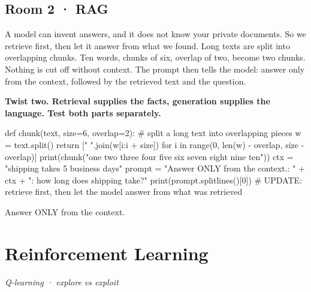 \documentclass[11pt,a4paper]{report}
\begin{document}
\section*{Room 2 · RAG}
A model can invent answers, and it does not know your private documents. So we retrieve first, then let it answer from what we found. Long texts are split into overlapping chunks. Ten words, chunks of six, overlap of two, become two chunks. Nothing is cut off without context. The prompt then tells the model: answer only from the context, followed by the retrieved text and the question.
\begin{tcolorbox}[colback=yellow!12,colframe=orange!70!black,boxrule=0.4pt,left=4pt,right=4pt,top=2pt,bottom=2pt]\textbf{Twist two. Retrieval supplies the facts, generation supplies the language. Test both parts separately.}\end{tcolorbox}
\begin{Code}
def chunk(text, size=6, overlap=2):         # split a long text into overlapping pieces
    w = text.split()
    return [" ".join(w[i:i + size]) for i in range(0, len(w) - overlap, size - overlap)]
print(chunk("one two three four five six seven eight nine ten"))
ctx = "shipping takes 5 business days"
prompt = "Answer ONLY from the context.\nContext: " + ctx + "\nQuestion: how long does shipping take?"
print(prompt.splitlines()[0])
# UPDATE: retrieve first, then let the model answer from what was retrieved
\end{Code}
\begin{Out}
Answer ONLY from the context.
\end{Out}
\chapter{Reinforcement Learning}
\textit{Q-learning · explore vs exploit}
\end{document}
